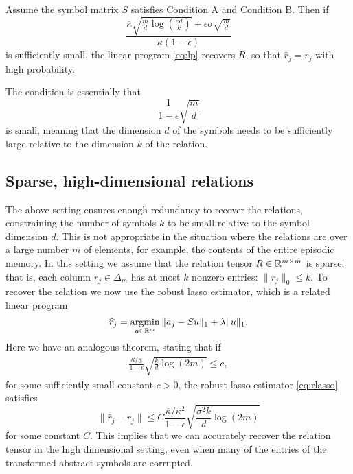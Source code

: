 \begin{thm}\label{theorem:main-improved}
  Assume the symbol matrix \(S\) satisfies Condition A and Condition B. Then if
  \begin{equation}
  \frac{\overline{\kappa}\sqrt{\frac{m}{d}\log\left(\frac{e d}{k}\right)}+\epsilon\sigma\sqrt{\frac{m}{d}}}{\underline{\kappa}(1-\epsilon)}
  \end{equation}
  is sufficiently small, the linear program \eqref{eq:lp} recovers \(R\), so that \(\hat r_j = r_j\) with high probability.
  \end{thm}

The condition is essentially that
  \begin{equation}
    \frac{1}{1-\epsilon} \sqrt{\frac{m}{d}}
  \end{equation}
  is small, meaning that the dimension \(d\) of the symbols needs to be sufficiently large relative
  to the dimension \(k\) of the relation.

  \subsection{Sparse, high-dimensional relations}

 The above setting ensures enough redundancy to recover the relations, constraining the number of symbols \(k\) to be small relative to the symbol dimension \(d\). This is not appropriate in the situation where the relations are over a large number \(m\) of elements, for example, the contents of the entire episodic memory.
 In this setting we assume that the relation tensor \(R \in \mathbb{R}^{m\times m}\) is sparse; that is,
 each column \(r_j \in \Delta_m\) has at most \(k\) nonzero entries: \(\|r_j\|_0 \leq k\). To recover the relation
 we now use the robust lasso estimator, which is a related linear program
\begin{equation}
  \widehat r_j = \mathop{\rm argmin}_{u \in\mathbb{R}^m} \| a_j - S u\|_1 + \lambda\|u\|_1. \label{eq:rlasso}
\end{equation}
Here we have an analogous theorem, stating that if
\begin{eqnarray}
  \frac{\overline{\kappa}/\underline{\kappa}}{1-\epsilon}\sqrt{\frac{k}{d}\log(2m)}\leq c,
\end{eqnarray}
for some sufficiently small constant \(c>0\), the robust lasso estimator \eqref{eq:rlasso} satisfies
\begin{equation}
  \|\hat r_j - r_j\| \leq C \frac{\overline{\kappa}/\underline{\kappa}^2}{1-\epsilon} \sqrt{\frac{\sigma^2 k}{d} \log(2m)}
\end{equation}
for some constant \(C\).
This implies that we can accurately recover the relation tensor in the high dimensional setting, even when many of the entries of the transformed abstract symbols are corrupted.


